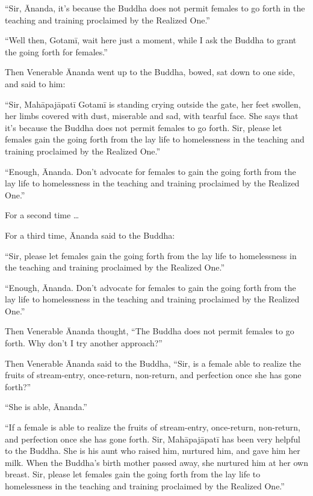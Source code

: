 \documentclass[12pt,openany]{book}%
\begin{document}
“Sir, Ānanda, it’s because the Buddha does not permit females to go forth in the teaching and training proclaimed by the Realized One.” 

“Well then, \textsanskrit{Gotamī}, wait here just a moment, while I ask the Buddha to grant the going forth for females.” 

Then Venerable Ānanda went up to the Buddha, bowed, sat down to one side, and said to him: 

“Sir, \textsanskrit{Mahāpajāpatī} \textsanskrit{Gotamī} is standing crying outside the gate, her feet swollen, her limbs covered with dust, miserable and sad, with tearful face. She says that it’s because the Buddha does not permit females to go forth. Sir, please let females gain the going forth from the lay life to homelessness in the teaching and training proclaimed by the Realized One.” 

“Enough, Ānanda. Don’t advocate for females to gain the going forth from the lay life to homelessness in the teaching and training proclaimed by the Realized One.” 

For a second time … 

For a third time, Ānanda said to the Buddha: 

“Sir, please let females gain the going forth from the lay life to homelessness in the teaching and training proclaimed by the Realized One.” 

“Enough, Ānanda. Don’t advocate for females to gain the going forth from the lay life to homelessness in the teaching and training proclaimed by the Realized One.” 

Then Venerable Ānanda thought, “The Buddha does not permit females to go forth. Why don’t I try another approach?” 

Then Venerable Ānanda said to the Buddha, “Sir, is a female able to realize the fruits of stream-entry, once-return, non-return, and perfection once she has gone forth?” 

“She is able, Ānanda.” 

“If a female is able to realize the fruits of stream-entry, once-return, non-return, and perfection once she has gone forth. Sir, \textsanskrit{Mahāpajāpatī} has been very helpful to the Buddha. She is his aunt who raised him, nurtured him, and gave him her milk. When the Buddha’s birth mother passed away, she nurtured him at her own breast. Sir, please let females gain the going forth from the lay life to homelessness in the teaching and training proclaimed by the Realized One.” 
\end{document}
